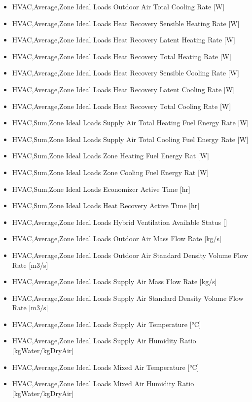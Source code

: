 \begin{itemize}
\item
  HVAC,Average,Zone Ideal Loads Outdoor Air Total Cooling Rate {[}W{]}
\item
  HVAC,Average,Zone Ideal Loads Heat Recovery Sensible Heating Rate {[}W{]}
\item
  HVAC,Average,Zone Ideal Loads Heat Recovery Latent Heating Rate {[}W{]}
\item
  HVAC,Average,Zone Ideal Loads Heat Recovery Total Heating Rate {[}W{]}
\item
  HVAC,Average,Zone Ideal Loads Heat Recovery Sensible Cooling Rate {[}W{]}
\item
  HVAC,Average,Zone Ideal Loads Heat Recovery Latent Cooling Rate {[}W{]}
\item
  HVAC,Average,Zone Ideal Loads Heat Recovery Total Cooling Rate {[}W{]}
\item
  HVAC,Sum,Zone Ideal Loads Supply Air Total Heating Fuel Energy Rate {[}W{]}
\item
  HVAC,Sum,Zone Ideal Loads Supply Air Total Cooling Fuel Energy Rate {[}W{]}
\item
  HVAC,Sum,Zone Ideal Loads Zone Heating Fuel Energy Rat {[}W{]}
\item
  HVAC,Sum,Zone Ideal Loads Zone Cooling Fuel Energy Rat {[}W{]}
\item
  HVAC,Sum,Zone Ideal Loads Economizer Active Time {[}hr{]}
\item
  HVAC,Sum,Zone Ideal Loads Heat Recovery Active Time {[}hr{]}
\item
  HVAC,Average,Zone Ideal Loads Hybrid Ventilation Available Status {[]}
\item
  HVAC,Average,Zone Ideal Loads Outdoor Air Mass Flow Rate {[}kg/s{]}
\item
  HVAC,Average,Zone Ideal Loads Outdoor Air Standard Density Volume Flow Rate {[}m3/s{]}
\item
  HVAC,Average,Zone Ideal Loads Supply Air Mass Flow Rate {[}kg/s{]}
\item
  HVAC,Average,Zone Ideal Loads Supply Air Standard Density Volume Flow Rate {[}m3/s{]}
\item
  HVAC,Average,Zone Ideal Loads Supply Air Temperature {[}\si{\degreeCelsius}{]}
\item
  HVAC,Average,Zone Ideal Loads Supply Air Humidity Ratio {[}kgWater/kgDryAir{]}
\item
  HVAC,Average,Zone Ideal Loads Mixed Air Temperature {[}\si{\degreeCelsius}{]}
\item
  HVAC,Average,Zone Ideal Loads Mixed Air Humidity Ratio {[}kgWater/kgDryAir{]}
\end{itemize}

